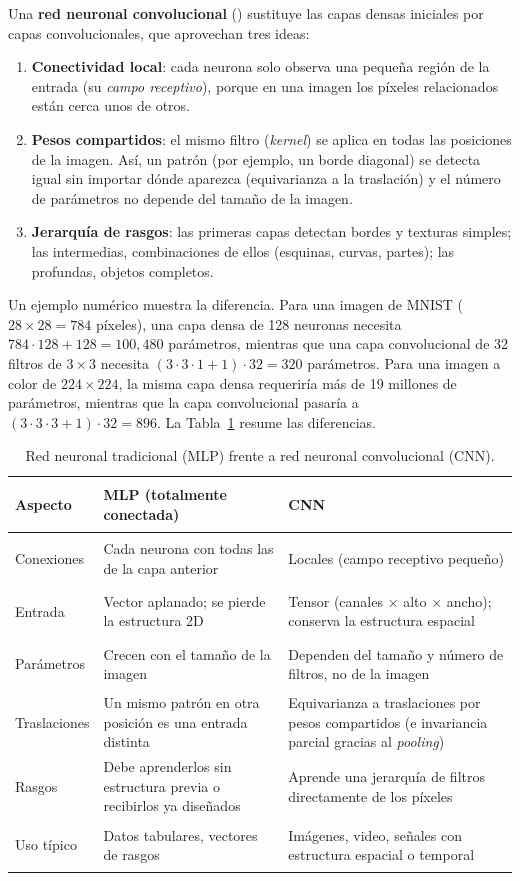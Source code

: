 \documentclass[11pt,letterpaper]{article}
\makeatletter
\newcommand{\cit@chk}[1]{\ifcsdef{citA@#1}{}{\PackageError{citas}{Cita no definida: #1}{}}}
\newcommand{\cit@item}[1]{\cit@chk{#1}\cit@sep\csuse{citA@#1}, \csuse{citY@#1}\gdef\cit@sep{; }}
\newcommand{\parencite}[1]{(\gdef\cit@sep{}\forcsvlist{\cit@item}{#1})}
\makeatother
\begin{document}
Una \textbf{red neuronal convolucional} \parencite{lecun1998} sustituye las capas densas iniciales por capas convolucionales, que aprovechan tres ideas:
\begin{enumerate}
  \item \textbf{Conectividad local}: cada neurona solo observa una pequeña región de la entrada (su \emph{campo receptivo}), porque en una imagen los píxeles relacionados están cerca unos de otros.
  \item \textbf{Pesos compartidos}: el mismo filtro (\emph{kernel}) se aplica en todas las posiciones de la imagen. Así, un patrón (por ejemplo, un borde diagonal) se detecta igual sin importar dónde aparezca (equivarianza a la traslación) y el número de parámetros no depende del tamaño de la imagen.
  \item \textbf{Jerarquía de rasgos}: las primeras capas detectan bordes y texturas simples; las intermedias, combinaciones de ellos (esquinas, curvas, partes); las profundas, objetos completos.
\end{enumerate}

Un ejemplo numérico muestra la diferencia. Para una imagen de MNIST ($28\times28 = 784$ píxeles), una capa densa de 128 neuronas necesita $784\cdot128 + 128 = 100{,}480$ parámetros, mientras que una capa convolucional de 32 filtros de $3\times3$ necesita $(3\cdot3\cdot1+1)\cdot32 = 320$ parámetros. Para una imagen a color de $224\times224$, la misma capa densa requeriría más de 19 millones de parámetros, mientras que la capa convolucional pasaría a $(3\cdot3\cdot3+1)\cdot32 = 896$. La Tabla~\ref{tab:mlp-cnn} resume las diferencias.

\begin{table}[H]
\centering
\caption{Red neuronal tradicional (MLP) frente a red neuronal convolucional (CNN).}
\label{tab:mlp-cnn}
\small
\begin{tabularx}{\linewidth}{>{\bfseries\raggedright\arraybackslash}p{2.6cm}>{\raggedright\arraybackslash}X>{\raggedright\arraybackslash}X}
\toprule
Aspecto & MLP (totalmente conectada) & CNN \\
\midrule
Conexiones & Cada neurona con todas las de la capa anterior & Locales (campo receptivo pequeño) \\
Entrada & Vector aplanado; se pierde la estructura 2D & Tensor (canales $\times$ alto $\times$ ancho); conserva la estructura espacial \\
Parámetros & Crecen con el tamaño de la imagen & Dependen del tamaño y número de filtros, no de la imagen \\
Traslaciones & Un mismo patrón en otra posición es una entrada distinta & Equivarianza a traslaciones por pesos compartidos (e invariancia parcial gracias al \emph{pooling}) \\
Rasgos & Debe aprenderlos sin estructura previa o recibirlos ya diseñados & Aprende una jerarquía de filtros directamente de los píxeles \\
Uso típico & Datos tabulares, vectores de rasgos & Imágenes, video, señales con estructura espacial o temporal \\
\bottomrule
\end{tabularx}
\end{table}
\end{document}

